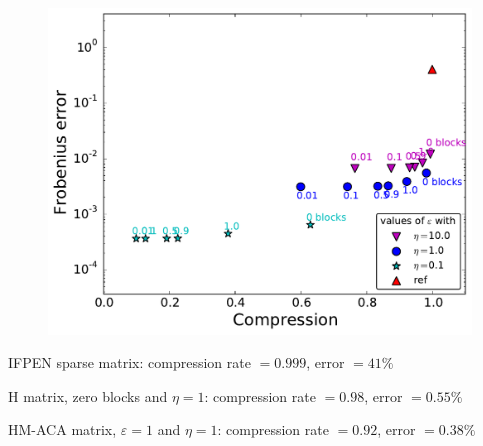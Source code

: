 \begin{frame}
\begin{figure}
\begin{minipage}[c]{.6\linewidth}
\includegraphics[width=\textwidth]{../images/graphe_compasparse_output_compression_18_08_2016matrice5364FracsTriangles.pdf}
\end{minipage}
\end{figure}

\vspace{-5pt}
{\footnotesize
IFPEN sparse matrix: compression rate $=0.999$, error \alert{$=41\%$}

H matrix, zero blocks and $\eta=1$: compression rate $=0.98$, error $=0.55\%$

HM-ACA matrix, $\varepsilon=1$ and $\eta=1$: compression rate $=0.92$, error \alert{$=0.38\%$}
}

\end{frame}


